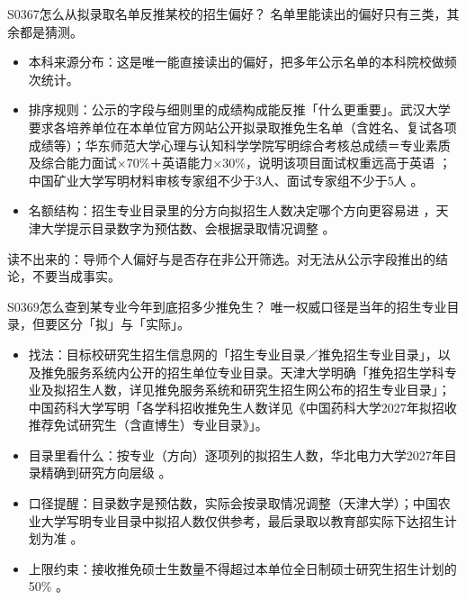 \begin{qa}{S0367}{怎么从拟录取名单反推某校的招生偏好？}
名单里能读出的偏好只有三类，其余都是猜测。
\begin{itemize}
  \item 本科来源分布：这是唯一能直接读出的偏好，把多年公示名单的本科院校做频次统计。
  \item 排序规则：公示的字段与细则里的成绩构成能反推「什么更重要」。武汉大学要求各培养单位在本单位官方网站公开拟录取推免生名单（含姓名、复试各项成绩等）；华东师范大学心理与认知科学学院写明综合考核总成绩＝专业素质及综合能力面试×70\%＋英语能力×30\%，说明该项目面试权重远高于英语 ；中国矿业大学写明材料审核专家组不少于3人、面试专家组不少于5人 。
  \item 名额结构：招生专业目录里的分方向拟招生人数决定哪个方向更容易进 ，天津大学提示目录数字为预估数、会根据录取情况调整 。
\end{itemize}
读不出来的：导师个人偏好与是否存在非公开筛选。对无法从公示字段推出的结论，不要当成事实。
\end{qa}

\begin{qa}{S0369}{怎么查到某专业今年到底招多少推免生？}
唯一权威口径是当年的招生专业目录，但要区分「拟」与「实际」。
\begin{itemize}
  \item 找法：目标校研究生招生信息网的「招生专业目录／推免招生专业目录」，以及推免服务系统内公开的招生单位专业目录。天津大学明确「推免招生学科专业及拟招生人数，详见推免服务系统和研究生招生网公布的招生专业目录」；中国药科大学写明「各学科招收推免生人数详见《中国药科大学2027年拟招收推荐免试研究生（含直博生）专业目录》」。
  \item 目录里看什么：按专业（方向）逐项列的拟招生人数，华北电力大学2027年目录精确到研究方向层级 。
  \item 口径提醒：目录数字是预估数，实际会按录取情况调整（天津大学）；中国农业大学写明专业目录中拟招人数仅供参考，最后录取以教育部实际下达招生计划为准 。
  \item 上限约束：接收推免硕士生数量不得超过本单位全日制硕士研究生招生计划的50\% 。
\end{itemize}
\end{qa}

